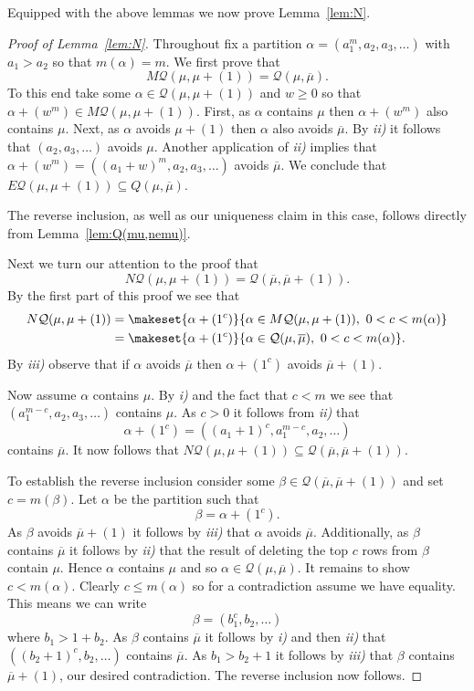 \documentclass{article}
\theoremstyle{plain}
\theoremstyle{definition}
\newcommand{\Q}{\mathcal{Q}}
\renewcommand{\ne}[1]{\overline{#1}}
\begin{document}
Equipped with the above lemmas we now prove Lemma~\ref{lem:N}.


\begin{proof}[Proof of Lemma~\ref{lem:N}]
Throughout fix a partition $\alpha = (a_1^m, a_2, a_3,\ldots)$  with $a_1>a_2$ so that $m(\alpha) = m$.  We first prove that
$$M\Q(\mu,\mu+(1)) =  \Q(\mu,\ne\mu).$$
To this end take some $\alpha\in \Q(\mu,\mu+(1))$ and $w\geq 0$ so that $\alpha + (w^m)\in M\Q(\mu,\mu+(1))$.  First, as $\alpha$ contains $\mu$ then $\alpha+(w^m)$ also contains $\mu$.   Next, as $\alpha$ avoids $\mu+(1)$ then $\alpha$ also avoids $\ne\mu$.  By \emph{ii)} it follows that $(a_2,a_3,\ldots)$ avoids $\mu$.  Another application of \emph{ii)}  implies that  $\alpha+(w^m) = ( (a_1+w)^m, a_2,a_3,\ldots)$ avoids $\ne\mu$. We conclude that $E\Q(\mu,\mu+(1))\subseteq Q(\mu,\ne\mu)$.  

The reverse inclusion, as well as our uniqueness claim in this case, follows directly from Lemma~\ref{lem:Q(mu,nemu)}.

\medskip

Next we turn our attention to the proof that 
$$N\Q(\mu,\mu+(1)) =  \Q(\ne\mu,\ne\mu+(1)).$$
By the first part of this proof we see that
\begin{align*}
    N\Q(\mu,\mu+(1)) &=\makeset{\alpha+(1^c)}{\alpha\in M\Q(\mu,\mu+(1)),\ 0<c<m(\alpha)}\\
    &= \makeset{\alpha+(1^c)}{\alpha\in \Q(\mu,\ne\mu),\  0<c<m(\alpha)}.
\end{align*}
By \emph{iii)} observe that if $\alpha$ avoids $\ne\mu$ then $\alpha+(1^c)$ avoids $\ne\mu +(1)$.  

Now assume $\alpha$ contains $\mu$.  By \emph{i)} and the fact that $c<m$ we see that $(a_1^{m-c}, a_2,a_3,\ldots)$
contains $\mu$.  As $c>0$ it follows from \emph{ii)} that 
$$\alpha+(1^c) = ( (a_1+1)^c, a_1^{m-c}, a_2,\ldots)$$
contains $\ne\mu$.  It now follows that $N\Q(\mu,\mu+(1)) \subseteq \Q(\ne\mu, \ne\mu+(1))$.  
 
 To establish the reverse inclusion consider some $\beta\in \Q(\ne\mu,\ne\mu+(1))$ and set $c = m(\beta)$.  Let $\alpha$ be the partition such that 
 $$\beta = \alpha+(1^c).$$  
 As $\beta$ avoids $\ne\mu+(1)$ it follows by \emph{iii)} that $\alpha$ avoids $\ne\mu$.   Additionally, as $\beta$ contains $\ne\mu$ it follows by \emph{ii)} that the result of deleting the top $c$ rows from $\beta$ contain $\mu$.  Hence $\alpha$ contains $\mu$ and so $\alpha\in \Q(\mu,\ne\mu)$.  It remains to show  $c<m(\alpha)$.  Clearly $c\leq m(\alpha)$ so for a contradiction assume we have equality. This means  we can write
 $$\beta = (b_1^c, b_2,\ldots)$$
 where $b_1> 1+ b_2$.  As $\beta$ contains $\ne\mu$ it follows by \emph{i)} and then \emph{ii)} that $((b_2+1)^c,b_2,\ldots)$ contains $\ne\mu$.  As $b_1> b_2+1$ it follows by \emph{iii)} that $\beta$ contains $\ne\mu+(1)$, our desired contradiction.  The reverse inclusion now follows. 


\end{proof}
\end{document}
